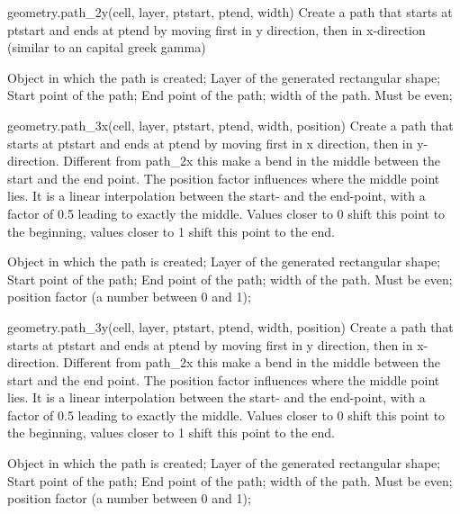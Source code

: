 \begin{APIfunc}{geometry.path\_2y(cell, layer, ptstart, ptend, width)}
    Create a path that starts at ptstart and ends at ptend by moving first in y direction, then in x-direction (similar to an capital greek gamma)
    \begin{APIparameters}
            Object in which the path is created;
            Layer of the generated rectangular shape;
            Start point of the path;
            End point of the path;
            width of the path. Must be even;
    \end{APIparameters}
\end{APIfunc}
\begin{APIfunc}{geometry.path\_3x(cell, layer, ptstart, ptend, width, position)}
    Create a path that starts at ptstart and ends at ptend by moving first in x direction, then in y-direction. Different from path\_2x this make a bend in the middle between the start and the end point. The position factor influences where the middle point lies. It is a linear interpolation between the start- and the end-point, with a factor of 0.5 leading to exactly the middle. Values closer to 0 shift this point to the beginning, values closer to 1 shift this point to the end.
    \begin{APIparameters}
            Object in which the path is created;
            Layer of the generated rectangular shape;
            Start point of the path;
            End point of the path;
            width of the path. Must be even;
            position factor (a number between 0 and 1);
    \end{APIparameters}
\end{APIfunc}
\begin{APIfunc}{geometry.path\_3y(cell, layer, ptstart, ptend, width, position)}
    Create a path that starts at ptstart and ends at ptend by moving first in y direction, then in x-direction. Different from path\_2x this make a bend in the middle between the start and the end point. The position factor influences where the middle point lies. It is a linear interpolation between the start- and the end-point, with a factor of 0.5 leading to exactly the middle. Values closer to 0 shift this point to the beginning, values closer to 1 shift this point to the end.
    \begin{APIparameters}
            Object in which the path is created;
            Layer of the generated rectangular shape;
            Start point of the path;
            End point of the path;
            width of the path. Must be even;
            position factor (a number between 0 and 1);
    \end{APIparameters}
\end{APIfunc}
